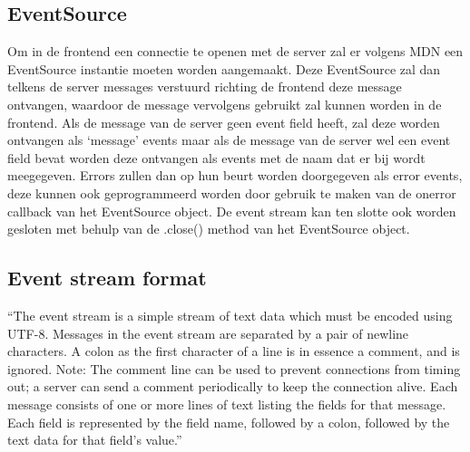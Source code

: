 \subsection{EventSource}
Om in de frontend een connectie te openen met de server zal er volgens MDN \textcite{DevMozSSE} een EventSource instantie moeten worden aangemaakt. Deze EventSource zal dan telkens de server messages verstuurd richting de frontend deze message ontvangen, waardoor de message vervolgens gebruikt zal kunnen worden in de frontend.
Als de message van de server geen event field heeft, zal deze worden ontvangen als ‘message’ events maar als de message van de server wel een event field bevat worden deze ontvangen als events met de naam dat er bij wordt meegegeven. Errors zullen dan op hun beurt worden doorgegeven als error events, deze kunnen ook geprogrammeerd worden door gebruik te maken van de onerror callback van het EventSource object. De event stream kan ten slotte ook worden gesloten met behulp van de .close() method van het EventSource object.

\subsection{Event stream format}
``The event stream is a simple stream of text data which must be encoded using UTF-8. Messages in the event stream are separated by a pair of newline characters. A colon as the first character of a line is in essence a comment, and is ignored.
Note: The comment line can be used to prevent connections from timing out; a server can send a comment periodically to keep the connection alive.
Each message consists of one or more lines of text listing the fields for that message. Each field is represented by the field name, followed by a colon, followed by the text data for that field's value.''\autocite{DevMozSSE}

